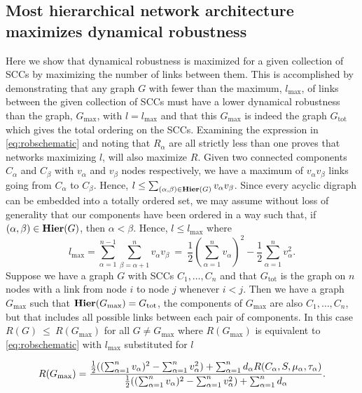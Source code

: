 \subsection{Most hierarchical network architecture maximizes dynamical robustness}
Here we show that dynamical robustness is maximized for a given collection of SCCs by maximizing the number of links between them. This is accomplished by demonstrating that any graph $G$ with fewer than the maximum, $l_{\mathrm{max}}$, of links between the given collection of SCCs must have a lower dynamical robustness than the graph, $G_{\mathrm{max}}$, with $l=l_{\mathrm{max}}$ and that this $G_{\mathrm{max}}$ is indeed the graph $G_{\mathrm{tot}}$ which gives the total ordering on the SCCs. Examining the expression in \ref{eq:robschematic} and noting that $R_{\alpha}$ are all strictly less than one proves that networks maximizing $l$, will also maximize $R$.  Given two connected components $C_{\alpha}$ and $C_{\beta}$ with $v_{\alpha}$ and $v_{\beta}$ nodes respectively, we have a maximum of $v_{\alpha} v_{\beta}$ links going from $C_{\alpha}$ to $C_{\beta}$.  Hence, $l \le \sum_{(\alpha,\beta) \in \mathbf{Hier}(G)} v_{\alpha} v_{\beta}$.  Since every acyclic digraph can be embedded into a totally ordered
set, we may assume without loss of generality that our components have
been ordered in a way such that, if $(\alpha,\beta) \in \mathbf{Hier}(G)$, then $\alpha <
\beta$.  Hence, $l \le l_{\mathrm{max}}$ where
$$l_{\mathrm{max}} = \sum_{\alpha=1}^{n-1}\sum_{\beta=\alpha+1}^{n}v_{\alpha}
v_{\beta}~=~\frac{1}{2} \left( \sum_{\alpha=1}^{n} v_{\alpha} \right)^2-\frac{1}{2} \sum_{\alpha=1}^{n}
v_{\alpha}^2.$$
Suppose we have a graph $G$ with SCCs $C_1,\ldots,C_n$ and that $G_{\mathrm{tot}}$
is the graph on $n$ nodes with a link from node $i$ to node $j$ whenever $i < j$.  Then we have a graph $G_{\mathrm{max}}$ such that $\mathbf{Hier} (G_{\mathrm{max}}) = G_{\mathrm{tot}}$, the components of $G_{\mathrm{max}}$ are also $C_1, \ldots, C_n$, but that includes all possible links between each pair of components. In this case $R(G)~\le~R(G_{\mathrm{max}})$ for all $G \ne G_{\mathrm{max}}$ where $R(G_{\mathrm{max}})$ is equivalent to \ref{eq:robschematic} with $l_{\mathrm{max}}$ substituted for $l$
\begin{widetext}
\begin{align} \label{eq:sccmaxrobustness}
R(G_{\mathrm{max}}) =
\frac{\frac{1}{2} ((\sum_{\alpha=1}^n v_{\alpha})^2 - \sum_{\alpha=1}^n v_{\alpha}^2) +
                    \sum_{\alpha=1}^n d_{\alpha}
                R(C_{\alpha},S,\mu_{\alpha},\tau_{\alpha})}
     {\frac{1}{2} ((\sum_{\alpha=1}^n v_{\alpha})^2 - \sum_{\alpha=1}^n v_{\alpha}^2) +
                    \sum_{\alpha=1}^n d_{\alpha}}.
\end{align}
\end{widetext}
